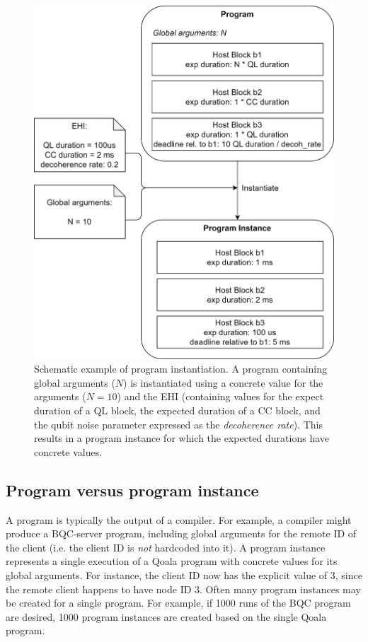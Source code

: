 \begin{figure}[ht]
    \centering
    \includegraphics[width=\columnwidth]{figures/qoala/instantiation.png}
    \caption{Schematic example of program instantiation.
    A program containing global arguments ($N$) is instantiated using a concrete value for the arguments ($N = 10$) and the EHI (containing values for the expect duration of a QL block, the expected duration of a CC block, and the qubit noise parameter expressed as the \textit{decoherence rate}). This results in a program instance for which the expected durations have concrete values.
    }
    \label{qoala:fig:app:instantiation}
\end{figure}

\subsection{Program versus program instance}
A program is typically the output of a compiler.
For example, a compiler might produce a BQC-server program, including global arguments for the remote ID of the client (i.e. the client ID is \textit{not} hardcoded into it).
A program instance represents a single execution of a Qoala program with concrete values for its global arguments.
For instance, the client ID now has the explicit value of 3, since the remote client happens to have node ID 3.
Often many program instances may be created for a single program.
For example, if 1000 runs of the BQC program are desired, 1000 program instances are created based on the single Qoala program.


